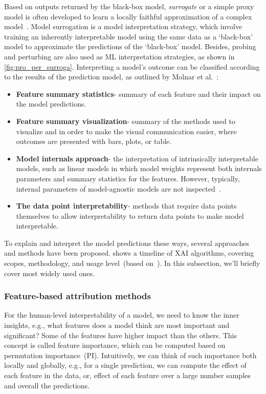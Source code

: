 \hspace*{3.5mm} Based on outputs returned by the black-box model, \textit{surrogate} or a simple proxy model is often developed to learn a locally faithful approximation of a complex model~\cite{stiglic2020interpretability}. Model surrogation is a model interpretation strategy, which involve training an inherently interpretable model using the same data as a `black-box' model to approximate the predictions of the `black-box' model. Besides, probing and perturbing are also used as ML interpretation strategies, as shown in \cref{fig:pro_per_surroga}. Interpreting a model's outcome can be classified according to the results of the prediction model, as outlined by Molnar et al.~\cite{molnar2019interpretable}:

\vspace{-2mm}
\begin{itemize}[noitemsep]
    \item \textbf{Feature summary statistics}- summary of each feature and their impact on the model predictions. 
    \item \textbf{Feature summary visualization}-  summary of the methods used to visualize and in order to make the visual communication easier, where outcomes are  presented with bars, plots, or table. 
    \item \textbf{Model internals approach}- the interpretation of intrinsically interpretable models, such as linear models in which model weights represent both internals parameters and summary statistics for the features. However, typically, internal parameters of model-agnostic models are not inspected~\cite{molnar2019interpretable}. 
    \item \textbf{The data point interpretability}- methods that require data points themselves to allow interpretability to  return data points to make model interpretable. 
\end{itemize}

\hspace*{3.5mm} To explain and interpret the model predictions these ways, several approaches and methods have been proposed. 
 shows a timeline of XAI algorithms, covering scopes, methodology, and usage level~(based on~\cite{das2020opportunities}). In this subsection, we'll briefly cover most widely used ones. 
\subsubsection{Feature-based attribution methods}
\label{subsubsec:FI_shap}
For the human-level interpretability of a model, we need to know the inner insights, e.g., what features does a model think are most important and significant? Some of the features have higher impact than the others. This concept is called feature importance, which can be computed based on permutation importance~(PI). Intuitively, we can think of such importance both locally and globally, e.g., for a single prediction, we can compute the effect of each feature in the data, or, effect of each feature over a large number samples and overall the predictions.

